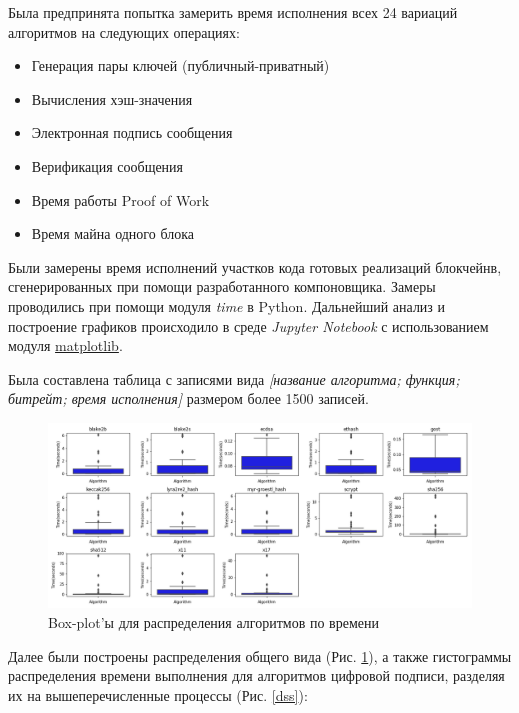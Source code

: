 Была предпринята попытка замерить время исполнения всех 24 вариаций алгоритмов на следующих операциях:

\begin{itemize}
\item Генерация пары ключей (публичный-приватный)
\item Вычисления хэш-значения
\item Электронная подпись сообщения
\item Верификация сообщения
\item Время работы Proof of Work
\item Время майна одного блока
\end{itemize}

Были замерены время исполнений участков кода готовых реализаций блокчейнв,
сгенерированных при помощи разработанного компоновщика.
Замеры проводились при помощи модуля \emph{time} в Python. Дальнейший анализ и
построение графиков происходило в среде \emph{Jupyter Notebook} с
использованием модуля \underline{matplotlib}.

Была составлена таблица с записями вида \emph{[название алгоритма; функция; битрейт;
время исполнения]} размером более 1500 записей.

\begin{figure}[h!]
    \centering
    \includegraphics[width=\textwidth]{./images/boxes}
    \caption{Box-plot'ы для распределения алгоритмов по времени}\label{boxes}
\end{figure}

Далее были построены распределения общего вида (Рис. \ref{boxes}), а также
гистограммы распределения времени выполнения для алгоритмов цифровой подписи,
разделяя их на вышеперечисленные процессы (Рис. \ref{dss}):

